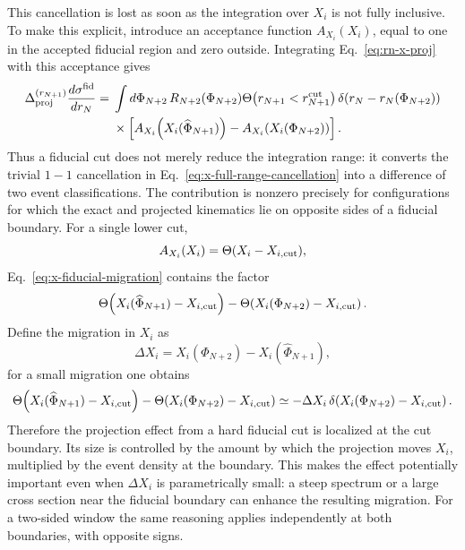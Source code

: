 \documentclass[11pt]{article}
\newcommand{\rn}{r_N}
\newcommand{\rnp}{r_{N+1}}
\newcommand{\cut}{\mathrm{cut}}
\newcommand{\Ph}{\Phi}
\begin{document}
This cancellation is lost as soon as the integration over \(X_i\) is not fully inclusive. To make this
explicit, introduce an acceptance function \(A_{X_i}(X_i)\), equal to one in the accepted fiducial region and
zero outside. Integrating Eq.~\eqref{eq:rn-x-proj} with this acceptance gives
\begin{align}
\Delta_{\rm proj}^{(\rnp)}
\frac{d\sigma^{\rm fid}}{d\rn}
={}&
\int d\Ph_{N+2}\,
R_{N+2}(\Ph_{N+2})
\Theta\!\left(\rnp<\rnp^{\cut}\right)
\delta\!\left(\rn-\rn(\Ph_{N+2})\right)
\nonumber\\
&\times
\left[
A_{X_i}\!\left(X_i(\widehat\Ph_{N+1})\right)
-
A_{X_i}\!\left(X_i(\Ph_{N+2})\right)
\right].
\label{eq:x-fiducial-migration}
\end{align}
Thus a fiducial cut does not merely reduce the integration range: it converts the trivial \(1-1\)
cancellation in Eq.~\eqref{eq:x-full-range-cancellation} into a difference of two event classifications.
The contribution is nonzero precisely for configurations for which the exact and projected kinematics
lie on opposite sides of a fiducial boundary.
For a single lower cut,
\begin{equation}
A_{X_i}(X_i)=\Theta(X_i-X_{i,\rm cut}),
\label{eq:x-lower-acceptance}
\end{equation}
Eq.~\eqref{eq:x-fiducial-migration} contains the factor
\begin{equation}
\Theta\!\left(X_i(\widehat\Ph_{N+1})-X_{i,\rm cut}\right)
-
\Theta\!\left(X_i(\Ph_{N+2})-X_{i,\rm cut}\right).
\label{eq:x-cut-classification-difference}
\end{equation}
Define the migration in \(X_i\) as
\begin{equation}
\Delta X_i
=
X_i(\Ph_{N+2})-X_i(\widehat\Ph_{N+1}),
\label{eq:delta-x-fiducial}
\end{equation}
for a small migration one obtains
\begin{equation}
\Theta\!\left(X_i(\widehat\Ph_{N+1})-X_{i,\rm cut}\right)
-
\Theta\!\left(X_i(\Ph_{N+2})-X_{i,\rm cut}\right)
\simeq
-\Delta X_i\,
\delta\!\left(X_i(\Ph_{N+2})-X_{i,\rm cut}\right).
\label{eq:x-boundary-localization}
\end{equation}
Therefore the projection effect from a hard fiducial cut is localized at the cut boundary. Its size is
controlled by the amount by which the projection moves \(X_i\), multiplied by the event density at the
boundary. This makes the effect potentially important even when \(\Delta X_i\) is parametrically small:
a steep spectrum or a large cross section near the fiducial boundary can enhance the resulting migration.
For a two-sided window the same reasoning applies independently at both boundaries, with opposite signs.
\end{document}
